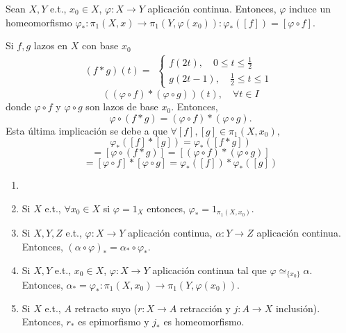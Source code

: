 \begin{prop}
  Sean $X, Y$ e.t., $x_{0} \in X$, $\varphi : X \to Y$ aplicación continua. Entonces, $\varphi$ induce un homeomorfismo $\varphi_*  : \pi_{1}(X,x) \to \pi_{1}(Y, \varphi(x_{0})): \varphi_*([f]) = [\varphi \circ f] $.
\end{prop}

\begin{dem}
  Si $f,g$ lazos en $X$ con base $x_{0}$
  \[ 
    (f * g)(t) =
    \begin{aligned}
      \begin{cases}
        f(2t), \quad 0 \leq t \leq \frac{1}{2} \\
        g(2t - 1), \quad \frac{1}{2} \leq t \leq 1
      \end{cases}
    \end{aligned} 
  \] 
  \[ 
    ((\varphi \circ f) * (\varphi \circ g))(t), \quad \forall t \in I 
  \] 
  donde $\varphi \circ f$ y $\varphi \circ g$ son lazos de base $x_{0}$. Entonces,
  \[ 
    \varphi \circ (f * g) = (\varphi \circ f) * (\varphi \circ g).
  \] 
  Esta última implicación se debe a que $\forall [f], [g] \in \pi_{1}(X,x_{0}),$
  \[ 
    \varphi_* ([f] * [g] ) = \varphi_*([f * g]) 
  \] 
  \[ 
    = [\varphi \circ (f * g)] = [(\varphi \circ f) * (\varphi \circ g)]
  \] 
  \[ 
    = [\varphi \circ f] * [\varphi \circ g] = \varphi_*([f]) * \varphi_*([g]) 
  \] 
\end{dem}

\begin{prop}
  \begin{enumerate}[label=(\roman*)]
    \item []
    \item Si $X$ e.t., $\forall x_{0} \in X$ si $\varphi = 1_{X}$ entonces, $\varphi_* = 1_{\pi_{1}(X,x_{0})}$.
    \item Si $X, Y, Z$ e.t., $\varphi : X \to Y$ aplicación continua, $\alpha :  Y \to Z$ aplicación continua. Entonces, $(\alpha \circ \varphi)_* = \alpha_* \circ \varphi_*$.
    \item Si $X, Y$ e.t., $x_{0} \in X$, $\varphi : X \to Y$ aplicación continua tal que $\varphi \simeq_{\{ x_{0} \}} \alpha$. Entonces, $\alpha_* = \varphi_*  : \pi_{1}(X, x_{0}) \to \pi_{1}(Y, \varphi(x_{0}))$.
    \item Si $X$ e.t., $A$ retracto suyo ($r : X \to A$ retracción y $j : A \to X$ inclusión). Entonces, $r_*$ es epimorfismo y $j_*$ es homeomorfismo.
  \end{enumerate}
\end{prop}


